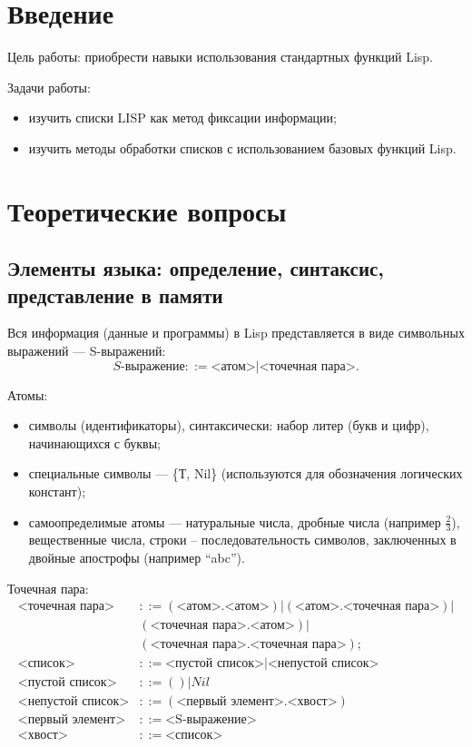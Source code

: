 \documentclass[a4paper, 14pt, unknownkeysallowed]{extreport}
\begin{document}

\setcounter{page}{2}
\tableofcontents

\chapter*{Введение}
Цель работы: приобрести навыки использования стандартных функций Lisp.

Задачи работы:
\begin{itemize}
	\item изучить списки LISP как метод фиксации информации;
	\item изучить методы обработки списков с использованием	базовых функций Lisp.
\end{itemize}


\chapter{Теоретические вопросы}
\section{Элементы языка: определение, синтаксис, представление в памяти}
Вся информация (данные и программы) в Lisp представляется в виде символьных выражений ---  S-выражений:
\begin{equation}
	S\text{-выражение} ::= \text{<атом>} | \text{<точечная пара>}.
\end{equation}

Атомы:
\begin{itemize}
	\item символы (идентификаторы), синтаксически: набор литер (букв и цифр), начинающихся с буквы;
	\item специальные символы --- \{Т, Nil\} (используются для обозначения логических констант);
	\item самоопределимые атомы --- натуральные числа, дробные числа (например $\frac{2}{3}$), вещественные числа, строки – последовательность
	символов, заключенных в двойные апострофы (например “abc”).
\end{itemize}

Точечная пара:
\begin{align*}
	\text{<точечная пара>} &::= (\text{<атом>.<атом>}) | (\text{<атом>.<точечная пара>}) | \\
	&(\text{<точечная пара>.<атом>}) | \\
	&(\text{<точечная пара>.<точечная пара>}); \\
	\text{<список>} &::= \text{<пустой список>} | \text{<непустой список>} \\
	\text{<пустой список>} &::= ( ) | Nil \\
	\text{<непустой список>} &::= (\text{<первый элемент>.<хвост>}) \\
	\text{<первый элемент>} &::= \text{<S-выражение>} \\
	\text{<хвост>} &::= \text{<список>}
\end{align*}
\end{document}
